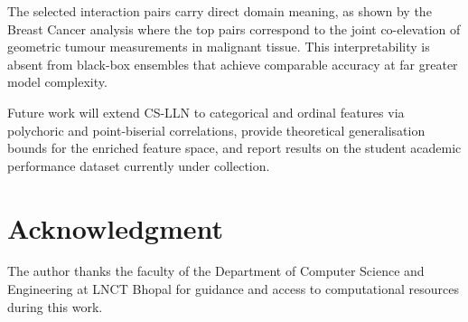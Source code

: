 \documentclass[conference]{IEEEtran}
\begin{document}
The selected interaction pairs carry direct domain meaning, as shown by
the Breast Cancer analysis where the top pairs correspond to the joint
co-elevation of geometric tumour measurements in malignant tissue.
This interpretability is absent from black-box ensembles that achieve
comparable accuracy at far greater model complexity.

Future work will extend CS-LLN to categorical and ordinal features via
polychoric and point-biserial correlations, provide theoretical
generalisation bounds for the enriched feature space, and report results
on the student academic performance dataset currently under collection.

\section*{Acknowledgment}
The author thanks the faculty of the Department of Computer Science and
Engineering at LNCT Bhopal for guidance and access to computational
resources during this work.
\end{document}
